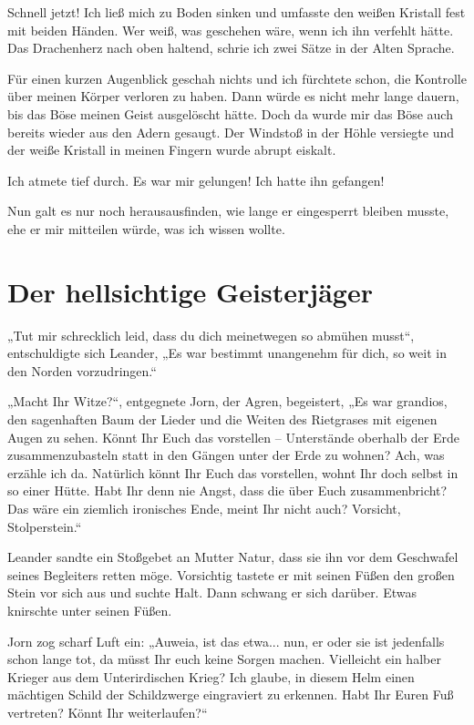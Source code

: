 \documentclass[10pt, a4paper, oneside]{book}
\begin{document}
Schnell jetzt! Ich ließ mich zu Boden sinken und umfasste den weißen Kristall fest mit beiden Händen. Wer weiß, was geschehen wäre, wenn ich ihn verfehlt hätte. Das Drachenherz nach oben haltend, schrie ich zwei Sätze in der Alten Sprache.

Für einen kurzen Augenblick geschah nichts und ich fürchtete schon, die Kontrolle über meinen Körper verloren zu haben. Dann würde es nicht mehr lange dauern, bis das Böse meinen Geist ausgelöscht hätte. Doch da wurde mir das Böse auch bereits wieder aus den Adern gesaugt. Der Windstoß in der Höhle versiegte und der weiße Kristall in meinen Fingern wurde abrupt eiskalt.

Ich atmete tief durch. Es war mir gelungen! Ich hatte ihn gefangen!

Nun galt es nur noch herausausfinden, wie lange er eingesperrt bleiben musste, ehe er mir mitteilen würde, was ich wissen wollte.





\newpage
\section{Der hellsichtige Geisterjäger}

„Tut mir schrecklich leid, dass du dich meinetwegen so abmühen musst“, entschuldigte sich Leander, „Es war bestimmt unangenehm für dich, so weit in den Norden vorzudringen.“

„Macht Ihr Witze?“, entgegnete Jorn, der Agren, begeistert, „Es war grandios, den sagenhaften Baum der Lieder und die Weiten des Rietgrases mit eigenen Augen zu sehen. Könnt Ihr Euch das vorstellen – Unterstände oberhalb der Erde zusammenzubasteln statt in den Gängen unter der Erde zu wohnen? Ach, was erzähle ich da. Natürlich könnt Ihr Euch das vorstellen, wohnt Ihr doch selbst in so einer Hütte. Habt Ihr denn nie Angst, dass die über Euch zusammenbricht? Das wäre ein ziemlich ironisches Ende, meint Ihr nicht auch? Vorsicht, Stolperstein.“

Leander sandte ein Stoßgebet an Mutter Natur, dass sie ihn vor dem Geschwafel seines Begleiters retten möge. Vorsichtig tastete er mit seinen Füßen den großen Stein vor sich aus und suchte Halt. Dann schwang er sich darüber. Etwas knirschte unter seinen Füßen.

Jorn zog scharf Luft ein: „Auweia, ist das etwa... nun, er oder sie ist jedenfalls schon lange tot, da müsst Ihr euch keine Sorgen machen. Vielleicht ein halber Krieger aus dem Unterirdischen Krieg? Ich glaube, in diesem Helm einen mächtigen Schild der Schildzwerge eingraviert zu erkennen. Habt Ihr Euren Fuß vertreten? Könnt Ihr weiterlaufen?“
\end{document}
